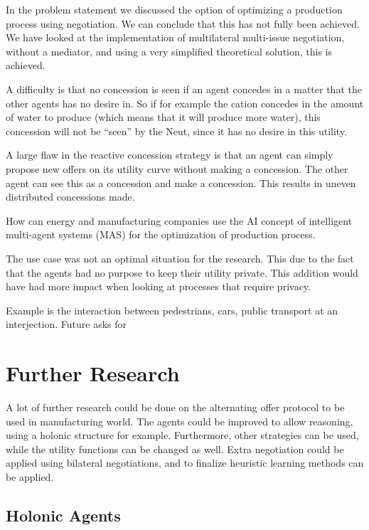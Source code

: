 In the problem statement we discussed the option of optimizing a production process using negotiation. We can conclude that this has not fully been achieved. We have looked at the implementation of multilateral multi-issue negotiation, without a mediator, and using a very simplified theoretical solution, this is achieved. 

A difficulty is that no concession is seen if an agent concedes in a matter that the other agents has no desire in. So if for example the cation concedes in the amount of water to produce (which means that it will produce more water), this concession will not be ``seen'' by the Neut, since it has no desire in this utility. %

A large flaw in the reactive concession strategy is that an agent can simply propose new offers on its utility curve without making a concession. The other agent can see this as a concession and make a concession. This results in uneven distributed concessions made. 

How can energy and manufacturing companies use the AI concept of intelligent multi-agent systems (MAS) for the optimization of production process.

The use case was not an optimal situation for the research. This due to the fact that the agents had no purpose to keep their utility private. This addition would have had more impact when looking at processes that require privacy.

Example is the interaction between pedestrians, cars, public transport at an interjection. Future asks for 

\section{Further Research}
A lot of further research could be done on the alternating offer protocol to be used in manufacturing world. The agents could be improved to allow reasoning, using a holonic structure for example. Furthermore, other strategies can be used, while the utility functions can be changed as well. Extra negotiation could be applied using bilateral negotiations, and to finalize heuristic learning methods can be applied.

\subsection{Holonic Agents}


